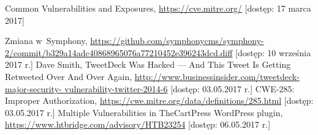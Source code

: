 \documentclass[12pt,a4paper,polish,thesis]{dcsbook}
\begin{document}
\begin{thebibliography}{1}
 Common Vulnerabilities and Exposures, \url{https://cve.mitre.org/} [dostęp: 17 marca 2017]

 Zmiana w~Symphony, \url{https://github.com/symphonycms/symphony-2/commit/b329a14adc40868965076a77210452e396243dcd.diff} [dostęp: 10 września 2017 r.]
 Dave Smith, TweetDeck Was Hacked — And This Tweet Is Getting Retweeted Over And Over Again, \url{http://www.businessinsider.com/tweetdeck-major-security- vulnerability-twitter-2014-6} [dostęp: 03.05.2017 r.]
 CWE-285: Improper Authorization, \url{https://cwe.mitre.org/data/definitions/285.html} [dostęp: 03.05.2017 r.]
 Multiple Vulnerabilities in TheCartPress WordPress plugin, \url{https://www.htbridge.com/advisory/HTB23254} [dostęp: 06.05.2017 r.]


\end{thebibliography}
\end{document}
